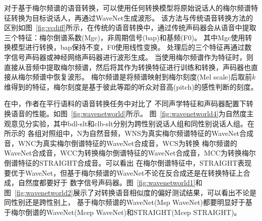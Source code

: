 对于基于梅尔频谱的语音转换，可以使用任何转换模型将原始说话人的梅尔频谱特征转换为目标说话人，再通过WaveNet生成波形。
该方法与传统语音转换方法的区别如图~\ref{fig:vcdiff}所示，在传统的语音转换中，通过传统声码器会从语音中提取三个特征：梅尔倒谱系数(Mgc)，非周期信号(bap)和基频(F0)。
其中Mgc使用转换模型进行转换，bap保持不变，F0使用线性变换。
处理后的三个特征再通过数字信号声码器或神经网络声码器进行波形生成。
当使用梅尔频谱作为特征时，则直接从音频中提取梅尔频谱，然后将其作为转换特征进行训练和转换，声码器也直接从梅尔频谱中恢复波形。
梅尔频谱是将频谱映射到梅尔刻度(Mel scale)后取前$k$维得到的特征，梅尔刻度是基于彼此等距的听众对音高(pitch)的感性判断的刻度。

在\cite{chen2018high}中，作者在平行语料的语音转换任务中对比了
不同声学特征和声码器配置下转换语音的性能。如图~\ref{fig:wavenetworld}所示。
图~\ref{fig:wavenetworld4}为自然度主观意见分实验，其中bdl-slt和clb-slt分别为跨性别说话人组和同性别说话人组。在所示的
各组对照组中，N为自然音频，WNS为真实梅尔频谱特征的WaveNet合成音，WNC为真实梅尔倒谱特征的WaveNet合成音，WCS为转换
梅尔频谱的WaveNet合成音，WCC为转换梅尔倒谱特征的WaveNet合成音，MCC为转换梅尔倒谱特征的STRAIGHT合成音。可以看出
在梅尔倒谱特征中，STRAIGHT表现要优于WaveNet，但基于梅尔频谱的WaveNet不论在反合成还是在转换特征上合成，自然度都要好于
数字信号声码器。图~\ref{fig:wavenetworld1}和图~\ref{fig:wavenetworld2}展示了对转换语音相似度的偏好测试结果，可以看出不论是同性别还是跨性别上，
基于梅尔频谱的WaveNet(Msp WaveNet)都要明显好于基于梅尔倒谱的WaveNet(Mcep WaveNet)和STRAIGHT(Mcep STRAIGHT)。





